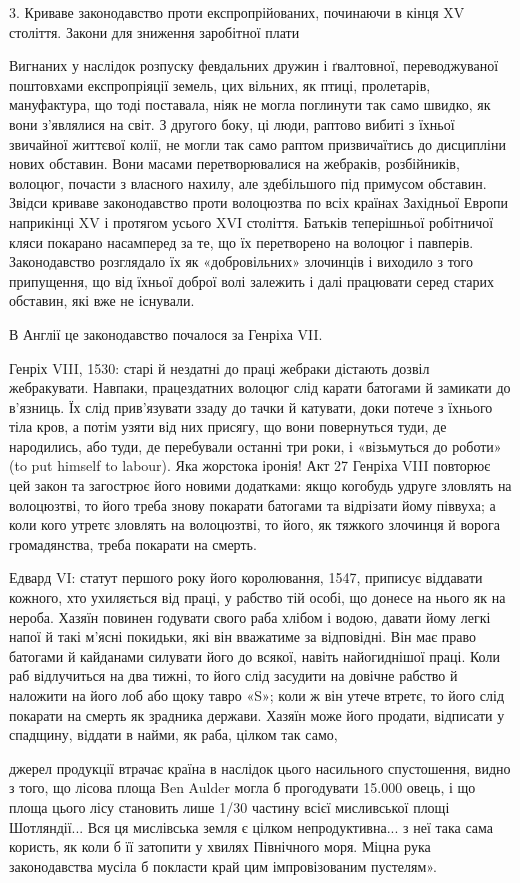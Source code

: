 3. Криваве законодавство проти експропрійованих, починаючи
в кінця XV століття. Закони для зниження заробітної плати

Вигнаних у наслідок розпуску февдальних дружин і ґвалтовної,
переводжуваної поштовхами експропріяції земель, цих
вільних, як птиці, пролетарів, мануфактура, що тоді поставала,
ніяк не могла поглинути так само швидко, як вони з’являлися
на світ. З другого боку, ці люди, раптово вибиті з їхньої звичайної
життєвої колії, не могли так само раптом призвичаїтись до
дисципліни нових обставин. Вони масами перетворювалися на
жебраків, розбійників, волоцюг, почасти з власного нахилу,
але здебільшого під примусом обставин. Звідси криваве законодавство
проти волоцюзтва по всіх країнах Західньої Европи
наприкінці XV і протягом усього XVI століття. Батьків теперішньої
робітничої кляси покарано насамперед за те, що їх перетворено
на волоцюг і павперів. Законодавство розглядало
їх як «добровільних» злочинців і виходило з того припущення,
що від їхньої доброї волі залежить і далі працювати серед старих
обставин, які вже не існували.

В Англії це законодавство почалося за Генріха VII.

Генріх VIII, 1530: старі й нездатні до праці жебраки дістають
дозвіл жебракувати. Навпаки, працездатних волоцюг слід карати
батогами й замикати до в’язниць. Їх слід прив’язувати ззаду до
тачки й катувати, доки потече з їхнього тіла кров, а потім узяти
від них присягу, що вони повернуться туди, де народились,
або туди, де перебували останні три роки, і «візьмуться до роботи»
(to put himself to labour). Яка жорстока іронія! Акт 27
Генріха VIII повторює цей закон та загострює його новими додатками:
якщо когобудь удруге зловлять на волоцюзтві, то його
треба знову покарати батогами та відрізати йому піввуха; а
коли кого утретє зловлять на волоцюзтві, то його, як тяжкого
злочинця й ворога громадянства, треба покарати на смерть.

Едвард VI: статут першого року його королювання, 1547,
приписує віддавати кожного, хто ухиляється від праці, у рабство
тій особі, що донесе на нього як на нероба. Хазяїн повинен годувати
свого раба хлібом і водою, давати йому легкі напої й такі
м’ясні покидьки, які він вважатиме за відповідні. Він має право
батогами й кайданами силувати його до всякої, навіть найогиднішої
праці. Коли раб відлучиться на два тижні, то його слід
засудити на довічне рабство й наложити на його лоб або щоку
тавро «S»; коли ж він утече втретє, то його слід покарати на
смерть як зрадника держави. Хазяїн може його продати, відписати
у спадщину, віддати в найми, як раба, цілком так само,

джерел продукції втрачає країна в наслідок цього насильного спустошення,
видно з того, що лісова площа Ben Aulder могла б прогодувати
15.000 овець, і що площа цього лісу становить лише 1/30 частину всієї
мисливської площі Шотляндії... Вся ця мислівська земля є цілком непродуктивна...
з неї така сама користь, як коли б її затопити у хвилях
Північного моря. Міцна рука законодавства мусіла б покласти край цим
імпровізованим пустелям».
